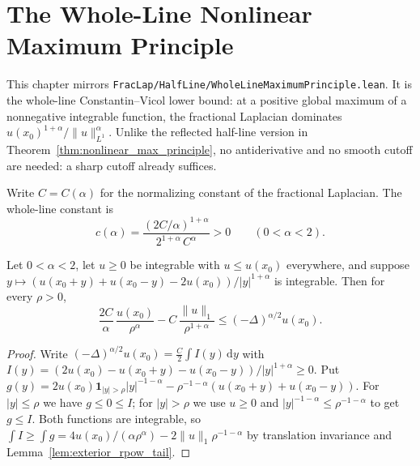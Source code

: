\chapter{The Whole-Line Nonlinear Maximum Principle}

This chapter mirrors \texttt{FracLap/HalfLine/WholeLineMaximumPrinciple.lean}. It is the whole-line Constantin--Vicol lower bound: at a positive global maximum of a nonnegative integrable function, the fractional Laplacian dominates $u(x_0)^{1+\alpha}/\lVert u\rVert_{L^1}^{\alpha}$. Unlike the reflected half-line version in Theorem~\ref{thm:nonlinear_max_principle}, no antiderivative and no smooth cutoff are needed: a sharp cutoff already suffices.

\begin{definition}\label{def:whole_line_nlmp_constant}
\leanok
Write $C = C(\alpha)$ for the normalizing constant of the fractional Laplacian. The whole-line constant is
\[
  c(\alpha) = \frac{(2C/\alpha)^{1+\alpha}}{2^{1+\alpha}\, C^{\alpha}} > 0 \qquad (0 < \alpha < 2).
\]
\end{definition}

\begin{lemma}\label{lem:whole_line_cutoff}
\leanok
Let $0 < \alpha < 2$, let $u \ge 0$ be integrable with $u \le u(x_0)$ everywhere, and suppose $y \mapsto (u(x_0 + y) + u(x_0 - y) - 2u(x_0))/\lvert y\rvert^{1+\alpha}$ is integrable. Then for every $\rho > 0$,
\[
  \frac{2C}{\alpha}\, \frac{u(x_0)}{\rho^{\alpha}} - C\, \frac{\lVert u \rVert_{1}}{\rho^{1+\alpha}} \le (-\Delta)^{\alpha/2} u(x_0).
\]
\end{lemma}

\begin{proof}
\leanok
Write $(-\Delta)^{\alpha/2} u(x_0) = \frac{C}{2} \int I(y)\, \mathrm{d}y$ with $I(y) = (2u(x_0) - u(x_0+y) - u(x_0-y))/\lvert y\rvert^{1+\alpha} \ge 0$. Put $g(y) = 2u(x_0) \mathbf 1_{\lvert y\rvert > \rho}\lvert y\rvert^{-1-\alpha} - \rho^{-1-\alpha}(u(x_0+y) + u(x_0-y))$. For $\lvert y\rvert \le \rho$ we have $g \le 0 \le I$; for $\lvert y\rvert > \rho$ we use $u \ge 0$ and $\lvert y\rvert^{-1-\alpha} \le \rho^{-1-\alpha}$ to get $g \le I$. Both functions are integrable, so $\int I \ge \int g = 4u(x_0)/(\alpha\rho^{\alpha}) - 2\lVert u\rVert_1 \rho^{-1-\alpha}$ by translation invariance and Lemma~\ref{lem:exterior_rpow_tail}.
\end{proof}

